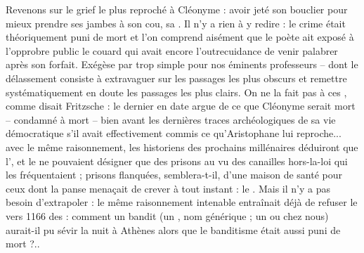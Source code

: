 {Revenons sur le grief le plus reproché à Cléonyme : avoir jeté son bouclier pour mieux prendre ses jambes à son cou, sa . Il n'y a rien à y redire : le crime était théoriquement puni de mort et l'on comprend aisément que le poète ait exposé à l'opprobre public le couard qui avait encore l'outrecuidance de venir palabrer après son forfait. Exégèse par trop simple pour nos éminents professeurs – dont le délassement consiste à extravaguer sur les passages les plus obscurs et remettre systématiquement en doute les passages les plus clairs. On ne la fait pas à ces , comme disait Fritzsche : le dernier en date argue de ce que Cléonyme serait mort – condamné à mort – bien avant les dernières traces archéologiques de sa vie démocratique s'il avait effectivement commis ce qu'Aristophane lui reproche... avec le même raisonnement, les historiens des prochains millénaires déduiront que l',  et le  ne pouvaient désigner que des prisons au vu des canailles hors-la-loi qui les fréquentaient ; prisons flanquées, semblera-t-il, d'une maison de santé pour ceux dont la panse menaçait de crever à tout instant : le . Mais il n'y a pas besoin d'extrapoler : le même raisonnement intenable entraînait déjà de refuser le vers 1166 des  : comment un bandit (un , nom générique ; un  ou  chez nous) aurait-il pu sévir la nuit à Athènes alors que le banditisme était aussi puni de mort ?..
}
